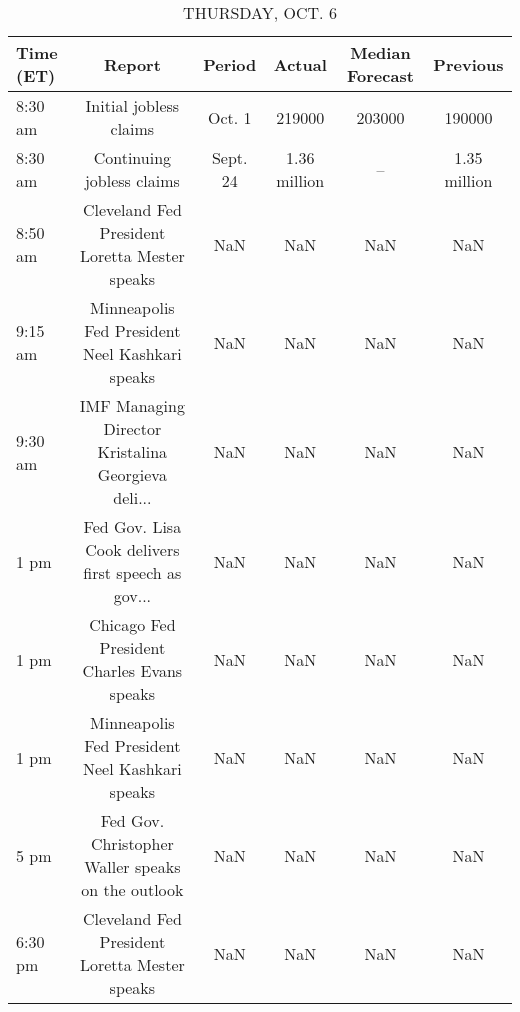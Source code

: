 \documentclass{article}%
\begin{document}
\begin{table}[htbp]%
\caption{THURSDAY, OCT. 6}%
\centering%
\begin{adjustbox}{width=1\textwidth}%
\begin{tabular}{lccccc}
\toprule
Time (ET) &                                             Report &   Period &       Actual & Median Forecast &     Previous \\
\midrule
  8:30 am &                             Initial jobless claims &   Oct. 1 &       219000 &          203000 &       190000 \\
  8:30 am &                          Continuing jobless claims & Sept. 24 & 1.36 million &              -- & 1.35 million \\
  8:50 am &      Cleveland Fed President Loretta Mester speaks &      NaN &          NaN &             NaN &          NaN \\
  9:15 am &     Minneapolis Fed President Neel Kashkari speaks &      NaN &          NaN &             NaN &          NaN \\
  9:30 am & IMF Managing Director Kristalina Georgieva deli... &      NaN &          NaN &             NaN &          NaN \\
     1 pm & Fed Gov. Lisa Cook delivers first speech as gov... &      NaN &          NaN &             NaN &          NaN \\
     1 pm &         Chicago Fed President Charles Evans speaks &      NaN &          NaN &             NaN &          NaN \\
     1 pm &     Minneapolis Fed President Neel Kashkari speaks &      NaN &          NaN &             NaN &          NaN \\
     5 pm &  Fed Gov. Christopher Waller speaks on the outlook &      NaN &          NaN &             NaN &          NaN \\
  6:30 pm &      Cleveland Fed President Loretta Mester speaks &      NaN &          NaN &             NaN &          NaN \\
\bottomrule
\end{tabular}
%
\end{adjustbox}%
\end{table}

%
\end{document}
